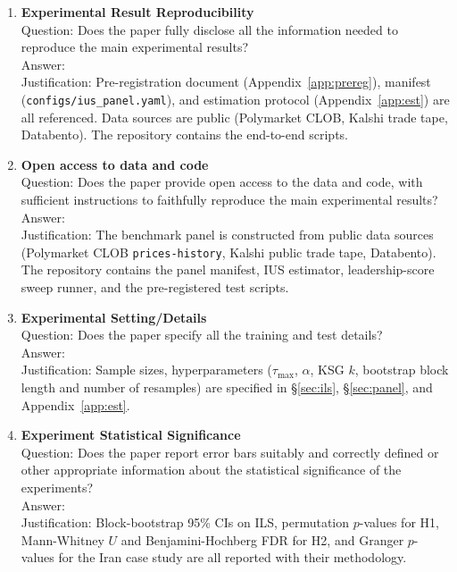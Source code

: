 \documentclass{article}
\begin{document}
\begin{enumerate}
\item {\bf Experimental Result Reproducibility}\\
Question: Does the paper fully disclose all the information needed to reproduce the main experimental results?\\
Answer: \answerYes{}\\
Justification: Pre-registration document (Appendix~\ref{app:prereg}), manifest (\texttt{configs/ius\_panel.yaml}), and estimation protocol (Appendix~\ref{app:est}) are all referenced. Data sources are public (Polymarket CLOB, Kalshi trade tape, Databento). The repository contains the end-to-end scripts.

\item {\bf Open access to data and code}\\
Question: Does the paper provide open access to the data and code, with sufficient instructions to faithfully reproduce the main experimental results?\\
Answer: \answerYes{}\\
Justification: The benchmark panel is constructed from public data sources (Polymarket CLOB \texttt{prices-history}, Kalshi public trade tape, Databento). The repository contains the panel manifest, IUS estimator, leadership-score sweep runner, and the pre-registered test scripts.

\item {\bf Experimental Setting/Details}\\
Question: Does the paper specify all the training and test details?\\
Answer: \answerYes{}\\
Justification: Sample sizes, hyperparameters ($\tau_\text{max}$, $\alpha$, KSG $k$, bootstrap block length and number of resamples) are specified in \S\ref{sec:ils}, \S\ref{sec:panel}, and Appendix~\ref{app:est}.

\item {\bf Experiment Statistical Significance}\\
Question: Does the paper report error bars suitably and correctly defined or other appropriate information about the statistical significance of the experiments?\\
Answer: \answerYes{}\\
Justification: Block-bootstrap 95\% CIs on ILS, permutation $p$-values for H1, Mann-Whitney $U$ and Benjamini-Hochberg FDR for H2, and Granger $p$-values for the Iran case study are all reported with their methodology.


\end{enumerate}
\end{document}
